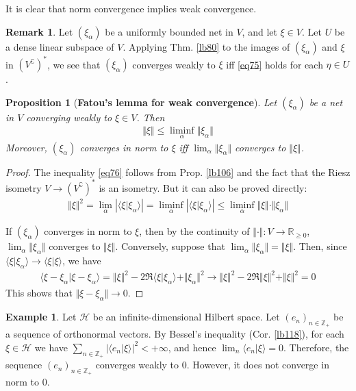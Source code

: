 \documentclass[12pt,b5paper,notitlepage]{article}
\theoremstyle{definition}
\newtheorem{eg}[df]{Example}
\newtheorem{rem}[df]{Remark}
\theoremstyle{plain}
\newtheorem{pp}[df]{Proposition}
\newcommand{\bk}[1]{\langle {#1}\rangle}
\newcommand{\Co}{\complement}
\newcommand{\Zbb}{\mathbb Z}
\newcommand{\Rbb}{\mathbb R}
\newcommand{\MH}{\mathcal H}
\numberwithin{equation}{section}
\begin{document}
It is clear that norm convergence implies weak convergence.


\begin{rem}
Let $(\xi_\alpha)$ be a uniformly bounded net in $V$, and let $\xi\in V$. Let $U$ be a dense linear subspace of $V$. Applying Thm. \ref{lb80} to the images of $(\xi_\alpha)$ and $\xi$ in $(V^\Co)^*$, we see that $(\xi_\alpha)$ converges weakly to $\xi$ iff \eqref{eq75} holds for each $\eta\in U$. 
\end{rem}



\begin{pp}[\textbf{Fatou's lemma for weak convergence}]\label{lb153} 
Let $(\xi_\alpha)$ be a net in $V$ converging weakly to $\xi\in V$. Then
\begin{align}\label{eq76}
\Vert\xi\Vert\leq\liminf_\alpha\Vert\xi_\alpha\Vert
\end{align}
Moreover, $(\xi_\alpha)$ converges in norm to $\xi$ iff  $\lim_\alpha\Vert\xi_\alpha\Vert$ converges to $\Vert\xi\Vert$.
\end{pp}



\begin{proof}
The inequality \eqref{eq76} follows from Prop. \ref{lb106} and the fact that the Riesz isometry $V\rightarrow(V^\Co)^*$ is an isometry. But it can also be proved directly:
\begin{align*}
\Vert\xi\Vert^2=\lim_\alpha|\bk{\xi|\xi_\alpha}|=\liminf_\alpha|\bk{\xi|\xi_\alpha}|\leq\liminf_\alpha\Vert\xi\Vert\cdot\Vert\xi_\alpha\Vert
\end{align*}

If $(\xi_\alpha)$ converges in norm to $\xi$, then by the continuity of $\Vert\cdot\Vert:V\rightarrow\Rbb_{\geq0}$, $\lim_\alpha\Vert\xi_\alpha\Vert$ converges to $\Vert\xi\Vert$. Conversely, suppose that $\lim_\alpha\Vert\xi_\alpha\Vert=\Vert\xi\Vert$. Then, since $\bk{\xi|\xi_\alpha}\rightarrow\bk{\xi|\xi}$, we have
\begin{align*}
\bk{\xi-\xi_\alpha|\xi-\xi_\alpha}=\Vert \xi\Vert^2-2\Re\bk{\xi|\xi_\alpha}+\Vert\xi_\alpha\Vert^2\rightarrow\Vert\xi\Vert^2-2\Re\Vert\xi\Vert^2+\Vert\xi\Vert^2=0
\end{align*}
This shows that $\Vert\xi-\xi_\alpha\Vert\rightarrow0$.
\end{proof}


\begin{eg}
Let $\MH$ be an infinite-dimensional Hilbert space. Let $(e_n)_{n\in \Zbb_+}$ be a sequence of orthonormal vectors. By Bessel's inequality (Cor. \ref{lb118}), for each $\xi\in\MH$ we have $\sum_{n\in\Zbb_+}|\bk{e_n|\xi}|^2<+\infty$, and hence $\lim_n\bk{e_n|\xi}=0$. Therefore, the sequence $(e_n)_{n\in\Zbb_+}$ converges weakly to $0$. However, it does not converge in norm to $0$. 
\end{eg}
\end{document}
